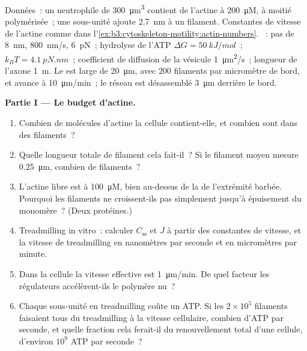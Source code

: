 \begin{problem}
\label{pb:b3:cytoskeleton-motility:1}
Données~: un neutrophile de \qty{300}{\micro m^3} contient de l'actine à
\qty{200}{\micro M}, à moitié polymérisée~; une sous-unité ajoute
\qty{2.7}{nm} à un filament. Constantes de vitesse de l'actine comme
dans l'\cref{ex:b3:cytoskeleton-motility:actin-numbers}. ~: pas
de \qty{8}{nm}, \qty{800}{nm/s},  \qty{6}{pN}~; hydrolyse
de l'ATP $\Delta G = \qty{50}{kJ/mol}$~; $k_{B}T = \qty{4.1}{pN.nm}$~;
coefficient de diffusion de la vésicule \qty{1}{\micro m^2/s}~; longueur
de l'axone \qty{1}{m}. Le  est large de \qty{20}{\micro m},
avec $200$ filaments par micromètre de bord, et avance à
\qty{10}{\micro m/min}~; le réseau est désassemblé \qty{3}{\micro m}
derrière le bord.

\medskip
\noindent\textbf{Partie I --- Le budget d'actine.}
\begin{enumerate}
  \item Combien de molécules d'actine la cellule contient-elle, et
        combien sont dans des filaments~?
  \item Quelle longueur totale de filament cela fait-il~? Si le
        filament moyen mesure \qty{0.25}{\micro m}, combien de
        filaments~?
  \item L'actine libre est à \qty{100}{\micro M}, bien au-dessus de la
         de l'extrémité barbée. Pourquoi les
        filaments ne croissent-ils pas simplement jusqu'à épuisement du
        monomère~? (Deux protéines.)
  \item Treadmilling in vitro~: calculer $C_{\text{ss}}$ et $J$ à partir
        des constantes de vitesse, et la vitesse de treadmilling en
        nanomètres par seconde et en micromètres par minute.
  \item Dans la cellule la vitesse effective est \qty{1}{\micro m/min}.
        De quel facteur les régulateurs accélèrent-ils le polymère nu~?
  \item Chaque sous-unité en treadmilling coûte un ATP. Si les
        $2\times 10^{5}$ filaments faisaient tous du treadmilling à la
        vitesse cellulaire, combien d'ATP par seconde, et quelle
        fraction cela ferait-il du renouvellement total d'une cellule,
        d'environ $10^{9}$ ATP par seconde~?
\end{enumerate}


\end{problem}
